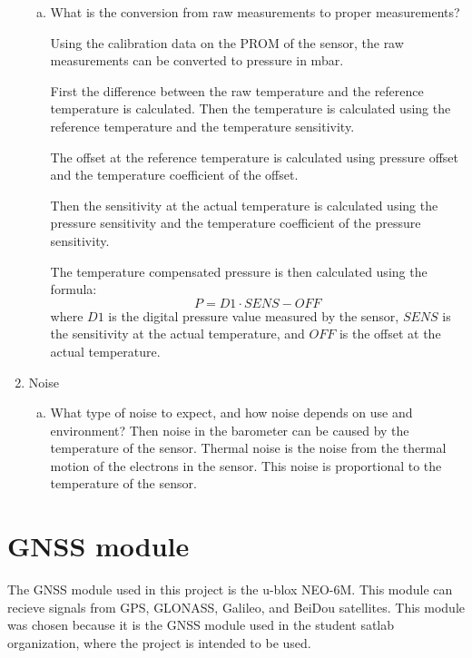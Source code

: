 \begin{enumerate}
\begin{enumerate}[(a)]
        \item What is the conversion from raw measurements to proper measurements?

        Using the calibration data on the PROM of the sensor, the raw measurements can be converted to pressure in mbar.

        First the difference between the raw temperature and the reference temperature is calculated.
        Then the temperature is calculated using the reference temperature and the temperature sensitivity.

        The offset at the reference temperature is calculated using pressure offset and the temperature coefficient of the offset.

        Then the sensitivity at the actual temperature is calculated using the pressure sensitivity and the temperature coefficient of the pressure sensitivity. %

        The temperature compensated pressure is then calculated using the formula:
        \begin{equation}
            P = D1 \cdot SENS - OFF
        \end{equation}
        where $D1$ is the digital pressure value measured by the sensor, $SENS$ is the sensitivity at the actual temperature, and $OFF$ is the offset at the actual temperature.
    \end{enumerate}
    \item Noise
    \begin{enumerate}[(a)]
        \item What type of noise to expect, and how noise depends on use and environment?
        Then noise in the barometer can be caused by the temperature of the sensor.
        Thermal noise is the noise from the thermal motion of the electrons in the sensor.
        This noise is proportional to the temperature of the sensor.
    \end{enumerate}
\end{enumerate}


\section{GNSS module}\label{sec:gnss-module}
The GNSS module used in this project is the u-blox NEO-6M.
This module can recieve signals from GPS, GLONASS, Galileo, and BeiDou satellites.
This module was chosen because it is the GNSS module used in the student satlab organization, where the project is intended to be used.

